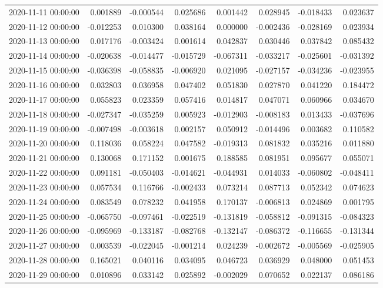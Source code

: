\begin{tabular}{lrrrrrrr}
2020-11-11 00:00:00 & 0.001889 & -0.000544 & 0.025686 & 0.001442 & 0.028945 & -0.018433 & 0.023637 \\
2020-11-12 00:00:00 & -0.012253 & 0.010300 & 0.038164 & 0.000000 & -0.002436 & -0.028169 & 0.023934 \\
2020-11-13 00:00:00 & 0.017176 & -0.003424 & 0.001614 & 0.042837 & 0.030446 & 0.037842 & 0.085432 \\
2020-11-14 00:00:00 & -0.020638 & -0.014477 & -0.015729 & -0.067311 & -0.033217 & -0.025601 & -0.031392 \\
2020-11-15 00:00:00 & -0.036398 & -0.058835 & -0.006920 & 0.021095 & -0.027157 & -0.034236 & -0.023955 \\
2020-11-16 00:00:00 & 0.032803 & 0.036958 & 0.047402 & 0.051830 & 0.027870 & 0.041220 & 0.184472 \\
2020-11-17 00:00:00 & 0.055823 & 0.023359 & 0.057416 & 0.014817 & 0.047071 & 0.060966 & 0.034670 \\
2020-11-18 00:00:00 & -0.027347 & -0.035259 & 0.005923 & -0.012903 & -0.008183 & 0.013433 & -0.037696 \\
2020-11-19 00:00:00 & -0.007498 & -0.003618 & 0.002157 & 0.050912 & -0.014496 & 0.003682 & 0.110582 \\
2020-11-20 00:00:00 & 0.118036 & 0.058224 & 0.047582 & -0.019313 & 0.081832 & 0.035216 & 0.011880 \\
2020-11-21 00:00:00 & 0.130068 & 0.171152 & 0.001675 & 0.188585 & 0.081951 & 0.095677 & 0.055071 \\
2020-11-22 00:00:00 & 0.091181 & -0.050403 & -0.014621 & -0.044931 & 0.014033 & -0.060802 & -0.048411 \\
2020-11-23 00:00:00 & 0.057534 & 0.116766 & -0.002433 & 0.073214 & 0.087713 & 0.052342 & 0.074623 \\
2020-11-24 00:00:00 & 0.083549 & 0.078232 & 0.041958 & 0.170137 & -0.006813 & 0.024869 & 0.001795 \\
2020-11-25 00:00:00 & -0.065750 & -0.097461 & -0.022519 & -0.131819 & -0.058812 & -0.091315 & -0.084323 \\
2020-11-26 00:00:00 & -0.095969 & -0.133187 & -0.082768 & -0.132147 & -0.086372 & -0.116655 & -0.131344 \\
2020-11-27 00:00:00 & 0.003539 & -0.022045 & -0.001214 & 0.024239 & -0.002672 & -0.005569 & -0.025905 \\
2020-11-28 00:00:00 & 0.165021 & 0.040116 & 0.034095 & 0.046723 & 0.036929 & 0.048000 & 0.051453 \\
2020-11-29 00:00:00 & 0.010896 & 0.033142 & 0.025892 & -0.002029 & 0.070652 & 0.022137 & 0.086186 \\

\end{tabular}
